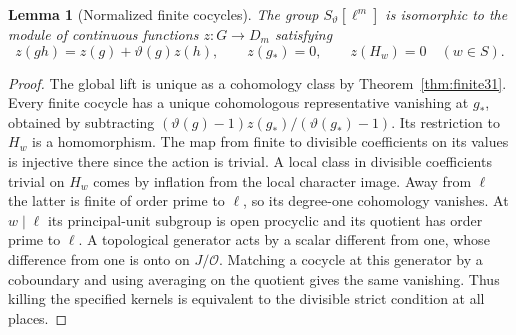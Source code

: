 \documentclass[a4paper,11pt]{article}
\newtheorem{lemma}[proposition]{Lemma}
\theoremstyle{definition}
\theoremstyle{remark}
\numberwithin{equation}{section}
\newcommand{\OO}{\mathcal O}
\begin{document}
\begin{lemma}[Normalized finite cocycles]\label{lem:norm31}
The group \(S_\vartheta[\ell^m]\) is isomorphic to the module of continuous functions \(z:G\to D_m\) satisfying
\[
 z(gh)=z(g)+\vartheta(g)z(h),\qquad z(g_*)=0,\qquad
 z(H_w)=0\quad(w\in S).
\]
\end{lemma}
\begin{proof}
The global lift is unique as a cohomology class by Theorem~\ref{thm:finite31}. Every finite cocycle has a unique cohomologous representative vanishing at \(g_*\), obtained by subtracting \((\vartheta(g)-1)z(g_*)/(\vartheta(g_*)-1)\). Its restriction to \(H_w\) is a homomorphism. The map from finite to divisible coefficients on its values is injective there since the action is trivial. A local class in divisible coefficients trivial on \(H_w\) comes by inflation from the local character image. Away from \(\ell\) the latter is finite of order prime to \(\ell\), so its degree-one cohomology vanishes. At \(w\mid\ell\) its principal-unit subgroup is open procyclic and its quotient has order prime to \(\ell\). A topological generator acts by a scalar different from one, whose difference from one is onto on \(J/\OO\). Matching a cocycle at this generator by a coboundary and using averaging on the quotient gives the same vanishing. Thus killing the specified kernels is equivalent to the divisible strict condition at all places.
\end{proof}
\end{document}
